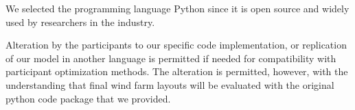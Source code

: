         We selected the programming language Python since it is open source and widely used by researchers in the industry.

        Alteration by the participants to our specific code implementation, or replication of our model in another language is permitted if needed for compatibility with participant optimization methods.
        The alteration is permitted, however, with the understanding that final wind farm layouts will be evaluated with the original python code package that we provided.